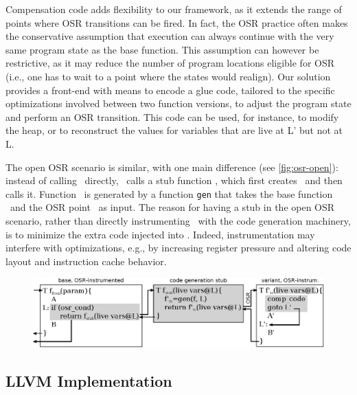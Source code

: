 Compensation code adds flexibility to our framework, as it extends the range of points where OSR transitions can be fired. In fact, the OSR practice often makes the conservative assumption that execution can always continue with the very same program state as the base function. %
This assumption can however be restrictive, as it may reduce the number of program locations eligible for OSR (i.e., one has to wait to a point where the states would realign). Our solution provides a front-end with means to encode a glue code, tailored to the specific optimizations involved between two function versions, to adjust the program state and perform an OSR transition. This code can be used, for instance, to modify the heap, or to reconstruct the values for variables that are live at \textsf{L'} but not at \textsf{L}.

The open OSR scenario is similar, with one main difference (see \myfigure\ref{fig:osr-open}): instead of calling \fosrto\ directly, \fosrfrom\ calls a stub function \fstub, which first creates \fosrto\ and then calls it. Function \fosrto\ is generated by a function {\tt gen} that takes the base function \fbase\ and the OSR point \osrpoint\ as input. The reason for having a stub in the open OSR scenario, rather than directly instrumenting \fbase\ with the code generation machinery, is to minimize the extra code injected into \fbase. Indeed, instrumentation may interfere with optimizations, e.g., by increasing register pressure and altering code layout and instruction cache behavior.

\ifdefined\noauthorea
\begin{figure}[t]
\begin{center}
\includegraphics[width=1.0\textwidth]{figures/osr-open/osr-open.eps}
\caption{\protect}
\end{center}
\end{figure}
\fi

\subsection{LLVM Implementation}

